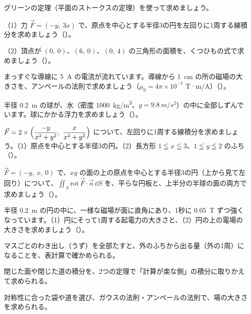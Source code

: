 \bkproblem グリーンの定理（平面のストークスの定理）を使って求めましょう。\par
（1）力 $\vec F=(-y,\ 3x)$ で、原点を中心とする半径3の円を左回りに1周する線積分を求めましょう\mbox{（）}。\par
（2）頂点が $(0,\ 0)$、$(6,\ 0)$、$(0,\ 4)$ の三角形の面積を、くつひもの式で求めましょう\mbox{（）}。

\bkproblem まっすぐな導線に \qty{5}{A} の電流が流れています。導線から \qty{1}{cm} の所の磁場の大きさを、アンペールの法則で求めましょう（$\mu_0=4\pi\times10^{-7}$ T·m/A）\mbox{（）}。


\bkproblem 半径 \qty{0.2}{m} の球が、水（密度 \qty{1000}{kg/m^3}、$g=\qty{9.8}{m/s^2}$）の中に全部しずんでいます。球にかかる浮力を求めましょう\mbox{（）}。

\bkproblem $\vec F=2\times\Bigl(\dfrac{-y}{x^2+y^2},\ \dfrac{x}{x^2+y^2}\Bigr)$ について、左回りに1周する線積分を求めましょう。（1）原点を中心とする半径3の円。（2）長方形 $1\leqq x\leqq3$、$1\leqq y\leqq2$ のふち\mbox{（）}。

\bkproblem $\vec F=(-y,\ x,\ 0)$ で、$xy$ の面の上の原点を中心とする半径3の円（上から見て左回り）について、$\iint_S\mathrm{rot}\,\vec F\cdot\vec n\,\dd S$ を、平らな円板と、上半分の半球の面の両方で求めましょう\mbox{（）}。

\bkproblem 半径 \qty{0.2}{m} の円の中に、一様な磁場が面に直角にあり、1秒に \qty{0.05}{T} ずつ強くなっています。（1）円にそって1周する起電力の大きさと、（2）円の上の電場の大きさを求めましょう\mbox{（）}。

\begin{furikaeri}
\begin{checklist}
\item マスごとのわき出し（うず）を全部たすと、外のふちから出る量（外の1周）になることを、表計算で確かめられる。
\item 閉じた面や閉じた道の積分を、2つの定理で「計算が楽な側」の積分に取りかえて求められる。
\item 対称性に合った袋や道を選び、ガウスの法則・アンペールの法則で、場の大きさを求められる。
\end{checklist}
\end{furikaeri}

